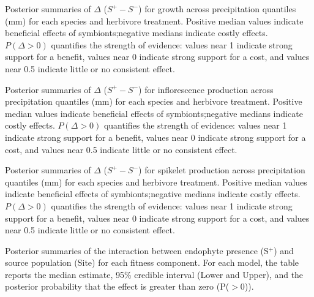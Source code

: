 \documentclass[12pt]{article}\usepackage[]{graphicx}\usepackage[dvipsnames]{xcolor}
\begin{document}
{\begin{table}[ht]
    \centering
    \caption{Posterior summaries of $\Delta$ ($S^{+} - S^{-}$) for growth across precipitation quantiles (mm) for each species and herbivore treatment.
    Positive median values indicate beneficial effects of symbionts;negative medians indicate costly effects. 
    $P(\Delta>0)$ quantifies the strength of evidence: values near 1 indicate
    strong support for a benefit, values near 0 indicate strong support for a cost, and values near 0.5 indicate little or no consistent effect.}
    \label{tab:delta_summary_grow}
    
\end{table}
\clearpage

\begin{table}[ht]
    \centering
    \caption{Posterior summaries of $\Delta$ ($S^{+} - S^{-}$) for inflorescence production across precipitation quantiles (mm) for each species and herbivore treatment.
    Positive median values indicate beneficial effects of symbionts;negative medians indicate costly effects.
    $P(\Delta>0)$ quantifies the strength of evidence: values near 1 indicate strong support for a benefit, values near 0 indicate strong support for a cost, and values near 0.5 indicate little or no consistent effect.}
    \label{tab:delta_summary_flow}
    
\end{table}
\clearpage

\begin{table}[ht]
    \centering
    \caption{Posterior summaries of $\Delta$ ($S^{+} - S^{-}$) for spikelet production across precipitation quantiles (mm) for each species and herbivore treatment.
    Positive median values indicate beneficial effects of symbionts;negative medians indicate costly effects.
    $P(\Delta>0)$ quantifies the strength of evidence: values near 1 indicate strong support for a benefit, values near 0 indicate strong support for a cost, and values near 0.5 indicate little or no consistent effect.}
    \label{tab:delta_summary_spike}
    
\end{table}
\clearpage

\begin{table}[ht]
    \centering
    \small
       \caption{Posterior summaries of the interaction between endophyte presence (S$^+$) and source population (Site) for each fitness component. For each model, the table reports the median estimate, 95\% credible interval (Lower and Upper), and the posterior probability that the effect is greater than zero (P($>0$)).}
    \label{tab:posterior_soil}
    
\end{table}
\clearpage



}
\end{document}
